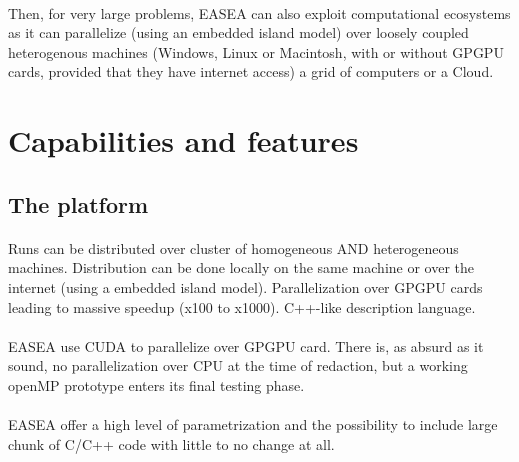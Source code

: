 \documentclass{book}
\begin{document}
\paragraph{} %
\label{par:}
  
Then, for very large problems, EASEA can also exploit computational ecosystems as it can parallelize (using an embedded island model) over loosely coupled heterogenous machines (Windows, Linux or Macintosh, with or without GPGPU cards, provided that they have internet access) a grid of computers or a Cloud.

\section{Capabilities and features} %
\label{sec:Capabilities}

  \subsection{The platform} %
  \label{sub:subsection name}
  \paragraph{} %
  \label{par:}
  
    Runs can be distributed over cluster of homogeneous AND heterogeneous machines.
    Distribution can be done locally on the same machine or over the internet (using a embedded island model).
    Parallelization over GPGPU cards leading to massive speedup (x100 to x1000).
    C++-like description language.
  \paragraph{} %
  \label{par:}
  
  EASEA use CUDA to parallelize over GPGPU card. There is, as absurd as it sound, no
  parallelization over CPU at the time of redaction, but a working openMP prototype
  enters its final testing phase.
  \paragraph{} %
  \label{par:}
    
  EASEA offer a high level of parametrization and the possibility to include large
  chunk of C/C++ code with little to no change at all.
\end{document}
